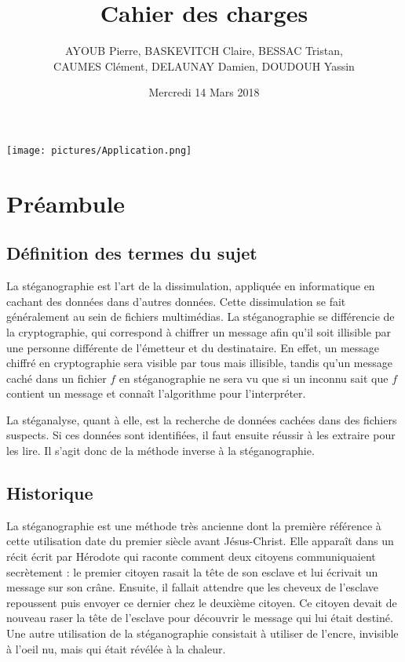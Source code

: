\documentclass[11pt]{article}
\title{\huge{\textbf Cahier des charges}}
\author{AYOUB Pierre, BASKEVITCH Claire, BESSAC Tristan, \\
CAUMES Clément, DELAUNAY Damien, DOUDOUH Yassin}
\date{Mercredi 14 Mars 2018}
\begin{document}
\maketitle
\vspace{20em}
\begin{center}\texttt{[image: pictures/Application.png]}\end{center}
\newpage

\tableofcontents

\small
\section{Préambule}

\subsection{Définition des termes du sujet}

La stéganographie est l'art de la dissimulation, appliquée en informatique en
cachant des données dans d'autres données. Cette dissimulation se fait
généralement au sein de fichiers multimédias. La stéganographie se différencie
de la cryptographie, qui correspond à chiffrer un message afin qu'il soit
illisible par une personne différente de l'émetteur et du destinataire. En
effet, un message chiffré en cryptographie sera visible par tous mais illisible,
tandis qu'un message caché dans un fichier $f$ en stéganographie ne sera vu que
si un inconnu sait que $f$ contient un message et connaît l'algorithme pour
l'interpréter. 

La stéganalyse, quant à elle, est la recherche de données cachées dans des
fichiers suspects. Si ces données sont identifiées, il faut ensuite réussir à
les extraire pour les lire. Il s'agit donc de la méthode inverse à la
stéganographie. 

\subsection{Historique}

La stéganographie est une méthode très ancienne dont la première référence à
cette utilisation date du premier siècle avant Jésus-Christ. Elle apparaît dans
un récit écrit par Hérodote qui raconte comment deux citoyens communiquaient
secrètement : le premier citoyen rasait la tête de son esclave et lui écrivait
un message sur son crâne. Ensuite, il fallait attendre que les cheveux de
l'esclave repoussent puis envoyer ce dernier chez le deuxième citoyen. Ce
citoyen devait de nouveau raser la tête de l'esclave pour découvrir le message
qui lui était destiné. Une autre utilisation de la stéganographie consistait à
utiliser de l'encre, invisible à l'oeil nu, mais qui était révélée à la chaleur.
\end{document}
